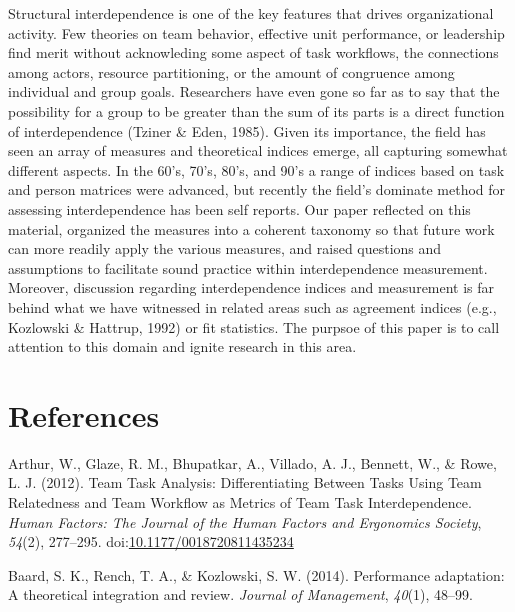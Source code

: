 \documentclass[english,,man]{apa6}
\theoremstyle{definition}
\theoremstyle{definition}
\theoremstyle{definition}
\theoremstyle{remark}
\begin{document}
Structural interdependence is one of the key features that drives
organizational activity. Few theories on team behavior, effective unit
performance, or leadership find merit without acknowleding some aspect
of task workflows, the connections among actors, resource partitioning,
or the amount of congruence among individual and group goals.
Researchers have even gone so far as to say that the possibility for a
group to be greater than the sum of its parts is a direct function of
interdependence (Tziner \& Eden, 1985). Given its importance, the field
has seen an array of measures and theoretical indices emerge, all
capturing somewhat different aspects. In the 60's, 70's, 80's, and 90's
a range of indices based on task and person matrices were advanced, but
recently the field's dominate method for assessing interdependence has
been self reports. Our paper reflected on this material, organized the
measures into a coherent taxonomy so that future work can more readily
apply the various measures, and raised questions and assumptions to
facilitate sound practice within interdependence measurement. Moreover,
discussion regarding interdependence indices and measurement is far
behind what we have witnessed in related areas such as agreement indices
(e.g., Kozlowski \& Hattrup, 1992) or fit statistics. The purpsoe of
this paper is to call attention to this domain and ignite research in
this area.

\newpage

\hypertarget{references}{%
\section{References}\label{references}}

\setlength{\parindent}{-0.5in}
\setlength{\leftskip}{0.5in}

\hypertarget{refs}{}
\leavevmode\hypertarget{ref-arthur_team_2012}{}%
Arthur, W., Glaze, R. M., Bhupatkar, A., Villado, A. J., Bennett, W., \&
Rowe, L. J. (2012). Team Task Analysis: Differentiating Between Tasks
Using Team Relatedness and Team Workflow as Metrics of Team Task
Interdependence. \emph{Human Factors: The Journal of the Human Factors
and Ergonomics Society}, \emph{54}(2), 277--295.
doi:\href{https://doi.org/10.1177/0018720811435234}{10.1177/0018720811435234}

\leavevmode\hypertarget{ref-baard_performance_2014}{}%
Baard, S. K., Rench, T. A., \& Kozlowski, S. W. (2014). Performance
adaptation: A theoretical integration and review. \emph{Journal of
Management}, \emph{40}(1), 48--99.
\end{document}
